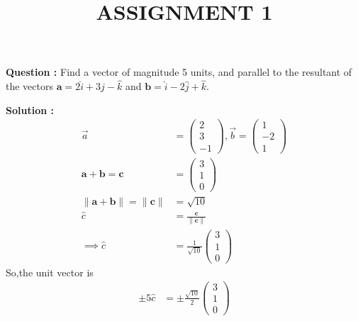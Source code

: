\documentclass[12pt]{article}
\let\vec\mathbf
\providecommand{\norm}[1]{\lVert#1\rVert}
\begin{document}
\title{\textbf{ASSIGNMENT 1}}
\date{}
\maketitle
\textbf{Question :} Find a vector of magnitude 5 units, and parallel to the resultant of the vectors $\vec{a} = 2\hat{i}+3\hat{j}-\hat{k}$ and $\vec{b} = \hat{i}-2\hat{j}+\hat{k}$.

\textbf{Solution :}
\begin{align}
    \Vec{a}&=\begin{pmatrix}
        2\\3\\-1
    \end{pmatrix},\Vec{b}=\begin{pmatrix}
        1\\-2\\1
    \end{pmatrix}\\
	\vec{a+b=c}&=\begin{pmatrix}
        3\\1\\0
    \end{pmatrix}\\
    \norm{\vec{a+b}}=\norm{\vec{c}}&=\sqrt{10}\\
	\hat{c}&=\frac{\vec{c}}{\norm{\vec{c}}} \\
    \implies\hat{c}&=\frac{1}{\sqrt{10}}\begin{pmatrix}
        3\\1\\0
    \end{pmatrix}
\end{align}
So,the unit vector is
\begin{align}
    \pm5\hat{c}&=\pm\frac{\sqrt{10}}{2}\begin{pmatrix}
        3\\1\\0
    \end{pmatrix}
\end{align}
   
\end{document}
